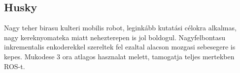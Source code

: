 \renewcommand{\xname}{Husky}
\renewcommand{\x}{0.99}
\renewcommand{\y}{0.67}
\renewcommand{\z}{0.39}
\renewcommand{\weight}{50 + 75}
\renewcommand{\img}{MobilisRobotok/clearpathrobotics/husky.jpg}
\renewcommand{\sources}{Forrás: https://robots.ros.org/husky}
\renewcommand{\captionn}{Négy kerekű mobilis platform.}
\renewcommand{\watherProf}{Igen}
\renewcommand{\sebesseg}{3.6}
\renewcommand{\AcAndGy}{Igen}
\renewcommand{\GPS}{Igen}

\subsection*{Husky}
Nagy teher birasu kulteri mobilis robot, leginkább kutatási célokra alkalmas, nagy kereknyomateka miatt nehezterepen is jol boldogul. Nagyfelbontasu inkrementalis enkoderekkel szereltek fel ezaltal alacson mozgasi sebesegere is kepes. Mukodese 3 ora atlagos hasznalat melett, tamogatja teljes mertekben ROS-t.

\renewcommand{\aspectratioPic}{0.6}


